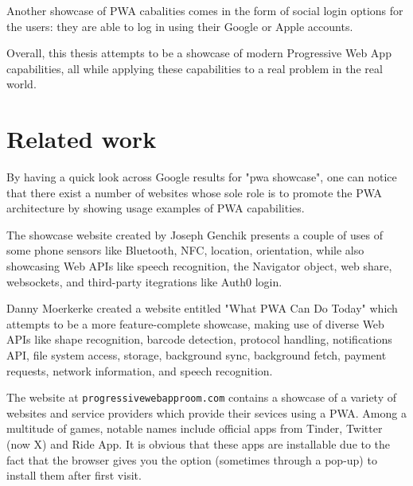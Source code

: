 Another showcase of PWA cabalities comes in the form of social login options for the users: they are able to log in using their Google or Apple accounts.

Overall, this thesis attempts to be a showcase of modern Progressive Web App capabilities, all while applying these capabilities to a real problem in the real world.

\section{Related work}

By having a quick look across Google results for "pwa showcase", one can notice that there exist a number of websites whose sole role is to promote the PWA architecture by showing usage examples of PWA capabilities.

The showcase website created by Joseph Genchik \cite{GenchikPWAShowcase} presents a couple of uses of some phone sensors like Bluetooth, NFC, location, orientation, while also showcasing Web APIs like speech recognition, the Navigator object, web share, websockets, and third-party itegrations like Auth0 login.

Danny Moerkerke created a website entitled "What PWA Can Do Today" \cite{MoerkerkePWAShowcase} which attempts to be a more feature-complete showcase, making use of diverse Web APIs like shape recognition, barcode detection, protocol handling, notifications API, file system access, storage, background sync, background fetch, payment requests, network information, and speech recognition.

The website at \verb|progressivewebapproom.com| \cite{PWARoom} contains a showcase of a variety of websites and service providers which provide their sevices using a PWA. Among a multitude of games, notable names include official apps from Tinder, Twitter (now X) and Ride App. It is obvious that these apps are installable due to the fact that the browser gives you the option (sometimes through a pop-up) to install them after first visit.
